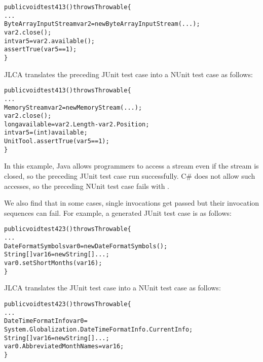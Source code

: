 \begin{CodeOut}%
\begin{alltt}
public void test413() throws Throwable\{
  ...
  ByteArrayInputStream var2=new ByteArrayInputStream(...);
  var2.close();
  int var5=var2.available();
  assertTrue(var5 == 1);
\}
\end{alltt}
\end{CodeOut}

JLCA translates the preceding JUnit test case into a NUnit test case as follows:

\begin{CodeOut}%
\begin{alltt}
public void test413() throws Throwable\{
  ...
  MemoryStream var2 = new MemoryStream(...);
  var2.close();
  long available = var2.Length - var2.Position;
  int var5 = (int) available;
  UnitTool.assertTrue(var5 == 1);
\}
\end{alltt}
\end{CodeOut}

In this example, Java allows programmers to access a stream even if the stream is closed, so the preceding JUnit test case run successfully. C\# does not allow such accesses, so the preceding NUnit test case fails with .

We also find that in some cases, single invocations get passed but their invocation sequences can fail. For example, a generated JUnit test case is as follows:

\begin{CodeOut}%
\begin{alltt}
public void test423() throws Throwable\{
  ...
  DateFormatSymbols var0=new DateFormatSymbols();
  String[] var16=new String[]{...};
  var0.setShortMonths(var16);
\}
\end{alltt}
\end{CodeOut}

JLCA translates the JUnit test case into a NUnit test case as follows:

\begin{CodeOut}%
\begin{alltt}
public void test423() throws Throwable\{
  ...
  DateTimeFormatInfo var0 =
  System.Globalization.DateTimeFormatInfo.CurrentInfo;
  String[] var16=new String[]{...};
  var0.AbbreviatedMonthNames = var16;
\}
\end{alltt}
\end{CodeOut}

